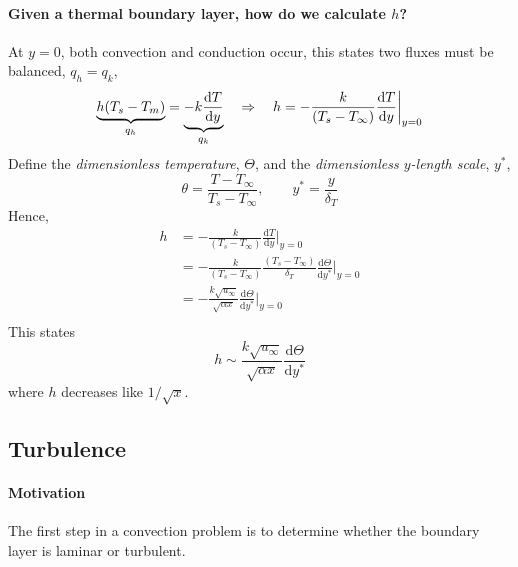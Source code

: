 \documentclass[12pt, a4paper]{article}
\begin{document}
\paragraph{Given a thermal boundary layer, how do we calculate $h$?} At $y=0$, both convection and conduction occur, this states two fluxes must be balanced, $q_h = q_k$,
\[
    \underbrace{h(T_s-T_m)}_{q_h} = \underbrace{-k\frac{\mathrm{d}T}{\mathrm{d}y}}_{q_k} \quad \Rightarrow \quad
    h = -\frac{k}{(T_s - T_\infty)} \frac{\mathrm{d}T}{\mathrm{d}y} \bigg\lvert_{y=0} \\
\]
Define the \textit{dimensionless temperature}, $\Theta$, and the \textit{dimensionless $y$-length scale}, $y^{*}$,
\[
    \theta = \frac{T-T_\infty}{T_s-T_\infty}, \quad \quad y^{*} = \frac{y}{\delta_T}
\]
Hence,
\begin{align*}
    h 
    & = -\frac{k}{(T_s - T_\infty)} \frac{\mathrm{d}T}{\mathrm{d}y} \bigg\lvert_{y=0} \\
    & = -\frac{k}{(T_s - T_\infty)} \frac{(T_s - T_\infty)}{\delta_T} \frac{\mathrm{d}\Theta}{\mathrm{d}y^{*}} \bigg\lvert_{y=0}\\
    & = -\frac{k\sqrt{u_\infty}}{\sqrt{\alpha x}} \frac{\mathrm{d}\Theta}{\mathrm{d}y^{*}} \bigg\lvert_{y=0}\\
\end{align*}
This states
\[
    h \sim \frac{k\sqrt{u_\infty}}{\sqrt{\alpha x}} \frac{\mathrm{d}\Theta}{\mathrm{d}y^{*}}
\]
where $h$ decreases like $1/\sqrt{x}$.



\subsection{Turbulence}
\paragraph{Motivation} The first step in a convection problem is to determine whether the boundary layer is laminar or turbulent.
\end{document}
